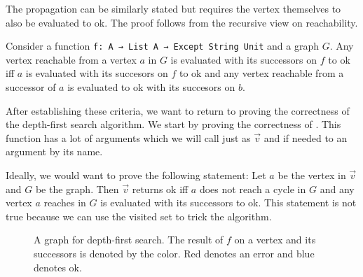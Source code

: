 The propagation can be similarly stated but requires the vertex themselves to also be evaluated to ok. The proof follows from the recursive view on reachability.

\begin{lemma}[\canReachLemma]
  Consider a function \lstinline|f: A → List A → Except String Unit| and a graph $G$.
  Any vertex reachable from a vertex $a$ in $G$ is evaluated with its successors on $f$ to ok iff $a$ is evaluated with its succesors on $f$ to ok and any vertex reachable from a successor of $a$ is evaluated to ok with its succesors on $b$.
\end{lemma}

After establishing these criteria, we want to return to proving the correctness of the depth-first search algorithm. We start by proving the correctness of \dfsstep. This function has a lot of arguments which we will call just as $\vec{v}$ and if needed to an argument by its name.

Ideally, we would want to prove the following statement: Let $a$ be the vertex in $\vec{v}$ and $G$ be the graph. Then \dfsstep $\vec{v}$ returns ok iff $a$ does not reach a cycle in $G$ and any vertex $a$ reaches in $G$ is evaluated with its successors to ok. This statement is not true because we can use the visited set to trick the algorithm.

\begin{figure}
  \centering
  \caption{A graph for depth-first search. The result of $f$ on a vertex and its successors is denoted by the color. Red denotes an error and blue denotes ok.}
  \label{fig:dfsSetProblem}
\end{figure}

